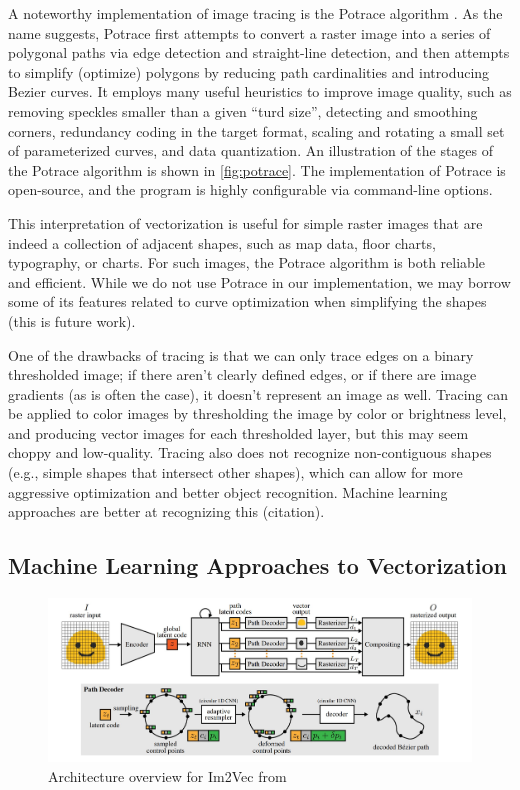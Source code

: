 A noteworthy implementation of image tracing is the Potrace algorithm \cite{selinger2003potrace}. As the name suggests, Potrace first attempts to convert a raster image into a series of polygonal paths via edge detection and straight-line detection, and then attempts to simplify (optimize) polygons by reducing path cardinalities and introducing Bezier curves. It employs many useful heuristics to improve image quality, such as removing speckles smaller than a given ``turd size'', detecting and smoothing corners, redundancy coding in the target format, scaling and rotating a small set of parameterized curves, and data quantization. An illustration of the stages of the Potrace algorithm is shown in \cref{fig:potrace}. The implementation of Potrace is open-source, and the program is highly configurable via command-line options.

This interpretation of vectorization is useful for simple raster images that are indeed a collection of adjacent shapes, such as map data, floor charts, typography, or charts. For such images, the Potrace algorithm is both reliable and efficient. While we do not use Potrace in our implementation, we may borrow some of its features related to curve optimization when simplifying the shapes (this is future work).

One of the drawbacks of tracing is that we can only trace edges on a binary thresholded image; if there aren't clearly defined edges, or if there are image gradients (as is often the case), it doesn't represent an image as well. Tracing can be applied to color images by thresholding the image by color or brightness level, and producing vector images for each thresholded layer, but this may seem choppy and low-quality. Tracing also does not recognize non-contiguous shapes (e.g., simple shapes that intersect other shapes), which can allow for more aggressive optimization and better object recognition. Machine learning approaches are better at recognizing this (citation).

\subsection{Machine Learning Approaches to Vectorization}

\begin{figure}[H]
    \centering
    \includegraphics[width=\linewidth]{Figures/im2vec_architecture.jpg}
    \caption{Architecture overview for Im2Vec from \cite{reddy2021im2vec}}
\end{figure}

